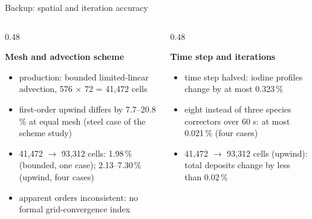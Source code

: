 \documentclass[aspectratio=169,10pt]{beamer}
\newcommand{\subhead}[1]{{\normalsize\bfseries\color{PSIblack}#1\par}\vspace{0.15em}}
\begin{document}
\begin{frame}[t]{Backup: spatial and iteration accuracy}
  \begin{columns}[T,onlytextwidth]
    \begin{column}{0.48\textwidth}
      \subhead{Mesh and advection scheme}
      \begin{itemize}
        \item production: bounded limited-linear advection, 576 $\times$ 72 = 41,472 cells
        \item first-order upwind differs by 7.7--20.8\,\% at equal mesh (steel case of the scheme study)
        \item 41,472 $\rightarrow$ 93,312 cells: 1.98\,\% (bounded, one case); 2.13--7.30\,\% (upwind, four cases)
        \item apparent orders inconsistent: no formal grid-convergence index
      \end{itemize}
    \end{column}
    \begin{column}{0.48\textwidth}
      \subhead{Time step and iterations}
      \begin{itemize}
        \item time step halved: iodine profiles change by at most 0.323\,\%
        \item eight instead of three species correctors over 60 s: at most 0.021\,\% (four cases)
        \item 41,472 $\rightarrow$ 93,312 cells (upwind): total deposits change by less than 0.02\,\%
      \end{itemize}
    \end{column}
  \end{columns}
\end{frame}
\end{document}
